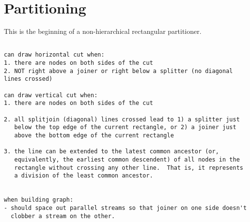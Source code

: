 \section{Partitioning}

This is the beginning of a non-hierarchical rectangular partitioner.

\scriptsize
\begin{verbatim}

can draw horizontal cut when:
1. there are nodes on both sides of the cut
2. NOT right above a joiner or right below a splitter (no diagonal lines crossed)

can draw vertical cut when:
1. there are nodes on both sides of the cut

2. all splitjoin (diagonal) lines crossed lead to 1) a splitter just
   below the top edge of the current rectangle, or 2) a joiner just
   above the bottom edge of the current rectangle

3. the line can be extended to the latest common ancestor (or,
   equivalently, the earliest common descendent) of all nodes in the
   rectangle without crossing any other line.  That is, it represents
   a division of the least common ancestor.


when building graph:
- should space out parallel streams so that joiner on one side doesn't
  clobber a stream on the other.


\end{verbatim}

